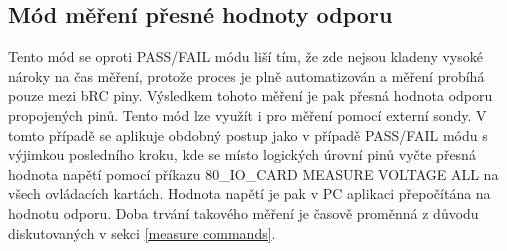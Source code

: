 \subsection{Mód měření přesné hodnoty odporu}
Tento mód se oproti PASS/FAIL módu liší tím, že zde nejsou kladeny vysoké nároky na čas měření, protože proces
je plně automatizován a měření probíhá pouze mezi bRC piny. Výsledkem tohoto měření je pak přesná hodnota odporu propojených pinů.
Tento mód lze využít i pro měření pomocí externí sondy. V tomto případě se aplikuje obdobný postup jako v případě PASS/FAIL módu
s výjimkou posledního kroku, kde se místo logických úrovní pinů vyčte přesná hodnota napětí pomocí příkazu
80\_IO\_CARD MEASURE VOLTAGE ALL na všech ovládacích kartách. Hodnota napětí je pak v PC aplikaci přepočítána na hodnotu odporu.
Doba trvání takového měření je časově proměnná z důvodu diskutovaných 
v sekci \ref{measure commands}.
